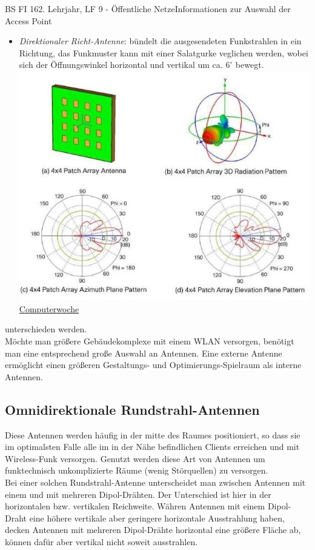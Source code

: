 \documentclass[11pt,twocolumn,oneside,openany,headings=optiontotoc,11pt,numbers=noenddot]{article}
\begin{document}
\begin{worksheet}{BS FI 16}{2. Lehrjahr, LF 9 - Öffentliche Netze}{Informationen zur Auswahl der Access Point}
\begin{itemize}
			\tiny{\href{https://www.computerwoche.de/g/wlan-antennen-und-access-points-richtig-positionieren,37573,8#galleryHeadline}{Computerwoche}}\normalsize
			\newpage
			\item \textit{Direktionaler Richt-Antenne}: bündelt die ausgesendeten Funkstrahlen in ein Richtung, das Funkmuster kann mit einer Salatgurke veglichen werden, wobei sich der Öffnungswinkel horizontal und vertikal um ca. \(6^\circ\) bewegt.
			\includegraphics[scale=0.75]{Bilder/dirRich.jpg}\\
			\tiny{\href{https://www.computerwoche.de/g/wlan-antennen-und-access-points-richtig-positionieren,37573,4#galleryHeadline}{Computerwoche}}\normalsize
		\end{itemize}
		unterschieden werden.\\
		Möchte man größere Gebäudekomplexe mit einem WLAN versorgen, benötigt man eine entsprechend große Auswahl an Antennen. Eine externe Antenne ermöglicht einen größeren Gestaltungs- und Optimierungs-Spielraum als interne Antennen.
		\subsection*{Omnidirektionale Rundstrahl-Antennen} Diese Antennen werden häufig in der mitte des Raumes positioniert, so dass sie im optimalsten Falle alle im in der Nähe befindlichen Clients erreichen und mit Wireless-Funk versorgen. Genutzt werden diese Art von Antennen um funktechnisch unkomplizierte Räume (wenig Störquellen) zu versorgen.\\
		Bei einer solchen Rundstrahl-Antenne unterscheidet man zwischen Antennen mit einem und mit mehreren Dipol-Drähten. Der Unterschied ist hier in der horizontalen bzw. vertikalen Reichweite. Währen Antennen mit einem Dipol-Draht eine höhere vertikale aber geringere horizontale Ausstrahlung haben, decken Antennen mit mehreren Dipol-Drähte horizontal eine größere Fläche ab, können dafür aber vertikal nicht soweit ausstrahlen.

\end{worksheet}
\end{document}
